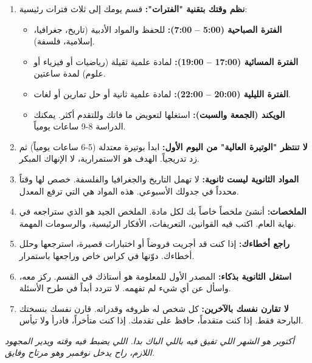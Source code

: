 \documentclass[12pt,a4paper]{book}
\newcommand{\quoteAr}[1]{%
	\begin{myquote}
		\itshape #1
	\end{myquote}
}
\begin{document}
	\begin{enumerate}
		\item \textbf{نظم وقتك بتقنية "الفترات":} قسم يومك إلى ثلاث فترات رئيسية:
		\begin{itemize}
			\item \textbf{الفترة الصباحية (5:00 – 7:00):} للحفظ والمواد الأدبية (تاريخ، جغرافيا، إسلامية، فلسفة).
			\item \textbf{الفترة المسائية (17:00 – 19:00):} لمادة علمية ثقيلة (رياضيات أو فيزياء أو علوم) لمدة ساعتين.
			\item \textbf{الفترة الليلية (20:00 – 22:00):} لمادة علمية ثانية أو حل تمارين أو لغات.
			\item \textbf{الويكند (الجمعة والسبت):} استغلها لتعويض ما فاتك وللتقدم أكثر. يمكنك الدراسة 8-9 ساعات يومياً.
		\end{itemize}
		
		\item \textbf{لا تنتظر "الوتيرة العالية" من اليوم الأول:} ابدأ بوتيرة معتدلة (5-6 ساعات يومياً) ثم زد تدريجياً. الهدف هو الاستمرارية، لا الإنهاك المبكر.
		
		\item \textbf{المواد الثانوية ليست ثانوية:} لا تهمل التاريخ والجغرافيا والفلسفة. خصص لها وقتاً محدداً في جدولك الأسبوعي. هذه المواد هي التي ترفع المعدل.
		
		\item \textbf{الملخصات:} أنشئ ملخصاً خاصاً بك لكل مادة. الملخص الجيد هو الذي ستراجعه في نهاية العام. اكتب فيه القوانين، التعريفات، الأفكار الرئيسية، والرسومات المهمة.
		
		\item \textbf{راجع أخطاءك:} إذا كنت قد أجريت فروضاً أو اختبارات قصيرة، استرجعها وحلل أخطاءك. دوّنها في كراس خاص وراجعها باستمرار.
		
		\item \textbf{استغل الثانوية بذكاء:} المصدر الأول للمعلومة هو أستاذك في القسم. ركز معه، واسأل عن أي شيء لم تفهمه. لا تتردد أبداً في طرح الأسئلة.
		
		\item \textbf{لا تقارن نفسك بالآخرين:} كل شخص له ظروفه وقدراته. قارن نفسك بنسختك البارحة فقط. إذا كنت متقدماً، حافظ على تقدمك. إذا كنت متأخراً، فادرأ ولا تيأس.
	\end{enumerate}
	
	\quoteAr{أكتوبر هو الشهر اللي تفيق فيه باللي الباك بدا. اللي يضبط فيه وقته ويدير المجهود اللازم، راح يدخل نوفمبر وهو مرتاح وفايق.}
	
\end{document}
